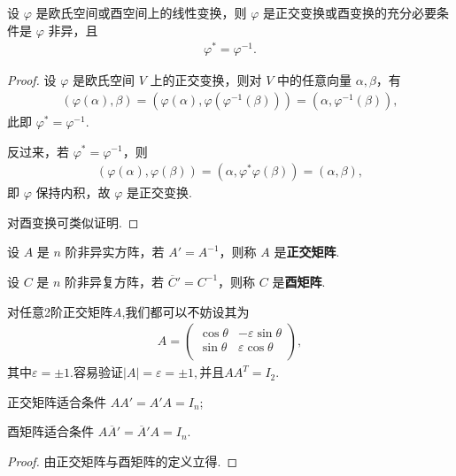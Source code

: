 \documentclass[../../main.tex]{subfiles}%
\begin{document}
\begin{theorem}\label{theorem:正交变换或酉变换g关于伴随算子的充要条件}
设 $\varphi$ 是欧氏空间或酉空间上的线性变换，则 $\varphi$ 是正交变换或酉变换的充分必要条件是 $\varphi$ 非异，且
\begin{align*}
\varphi^* = \varphi^{-1}.
\end{align*}
\end{theorem}
\begin{proof}

设 $\varphi$ 是欧氏空间 $V$ 上的正交变换，则对 $V$ 中的任意向量 $\alpha,\beta$，有
\begin{align*}
(\varphi(\alpha),\beta) = (\varphi(\alpha),\varphi(\varphi^{-1}(\beta))) = (\alpha,\varphi^{-1}(\beta)),
\end{align*}
此即 $\varphi^* = \varphi^{-1}$.

反过来，若 $\varphi^* = \varphi^{-1}$，则
\begin{align*}
(\varphi(\alpha),\varphi(\beta)) = (\alpha,\varphi^*\varphi(\beta)) = (\alpha,\beta),
\end{align*}
即 $\varphi$ 保持内积，故 $\varphi$ 是正交变换.

对酉变换可类似证明.

\end{proof}

\begin{definition}[正交矩阵和酉矩阵]
设 $A$ 是 $n$ 阶非异实方阵，若 $A' = A^{-1}$，则称 $A$ 是\textbf{正交矩阵}. 

设 $C$ 是 $n$ 阶非异复方阵，若 $\overline{C}' = C^{-1}$，则称 $C$ 是\textbf{酉矩阵}.
\end{definition}
\begin{remark}
对任意2阶正交矩阵$A$,我们都可以不妨设其为
\begin{align*}
A=\left( \begin{matrix}
\cos \theta&		-\varepsilon \sin \theta\\
\sin \theta&		\varepsilon \cos \theta\\
\end{matrix} \right) ,
\end{align*}
其中$\varepsilon=\pm 1$.容易验证$|A|=\varepsilon =\pm 1,$并且$AA^T=I_2.$
\end{remark}

\begin{theorem}
正交矩阵适合条件 $AA' = A'A = I_n$;

酉矩阵适合条件 $A\overline{A}' = \overline{A}'A = I_n$.
\end{theorem}
\begin{proof}

由正交矩阵与酉矩阵的定义立得.

\end{proof}
\end{document}
